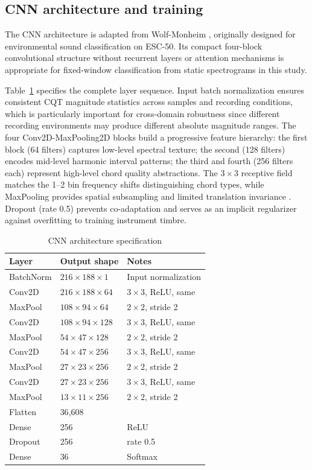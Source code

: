 \documentclass[pdflatex,sn-mathphys-num,iicol]{sn-jnl}
\theoremstyle{thmstyleone}
\theoremstyle{thmstyletwo}
\theoremstyle{thmstylethree}
\begin{document}
\subsection{CNN architecture and training}\label{subsec3_3}

The CNN architecture is adapted from Wolf-Monheim \cite{Wolf-Monheim2025}, originally designed for environmental sound classification on ESC-50. Its compact four-block convolutional structure without recurrent layers or attention mechanisms is appropriate for fixed-window classification from static spectrograms in this study.

Table~\ref{tab:cnn-architecture} specifies the complete layer sequence. Input batch normalization ensures consistent CQT magnitude statistics across samples and recording conditions, which is particularly important for cross-domain robustness since different recording environments may produce different absolute magnitude ranges. The four Conv2D-MaxPooling2D blocks build a progressive feature hierarchy: the first block (64 filters) captures low-level spectral texture; the second (128 filters) encodes mid-level harmonic interval patterns; the third and fourth (256 filters each) represent high-level chord quality abstractions. The $3\times3$ receptive field matches the 1--2 bin frequency shifts distinguishing chord types, while MaxPooling provides spatial subsampling and limited translation invariance \cite{Purwono2022}. Dropout (rate 0.5) prevents co-adaptation and serves as an implicit regularizer against overfitting to training instrument timbre.

\begin{table}[h]
\caption{CNN architecture specification}\label{tab:cnn-architecture}
\begin{tabularx}{\columnwidth}{@{}lXl@{}}
\toprule
Layer & Output shape & Notes \\
\midrule
BatchNorm & $216{\times}188{\times}1$ & Input normalization \\
Conv2D & $216{\times}188{\times}64$ & $3{\times}3$, ReLU, same \\
MaxPool & $108{\times}94{\times}64$ & $2{\times}2$, stride 2 \\
Conv2D & $108{\times}94{\times}128$ & $3{\times}3$, ReLU, same \\
MaxPool & $54{\times}47{\times}128$ & $2{\times}2$, stride 2 \\
Conv2D & $54{\times}47{\times}256$ & $3{\times}3$, ReLU, same \\
MaxPool & $27{\times}23{\times}256$ & $2{\times}2$, stride 2 \\
Conv2D & $27{\times}23{\times}256$ & $3{\times}3$, ReLU, same \\
MaxPool & $13{\times}11{\times}256$ & $2{\times}2$, stride 2 \\
Flatten & 36{,}608 & \\
Dense & 256 & ReLU \\
Dropout & 256 & rate 0.5 \\
Dense & 36 & Softmax \\
\bottomrule
\end{tabularx}
\end{table}
\end{document}
